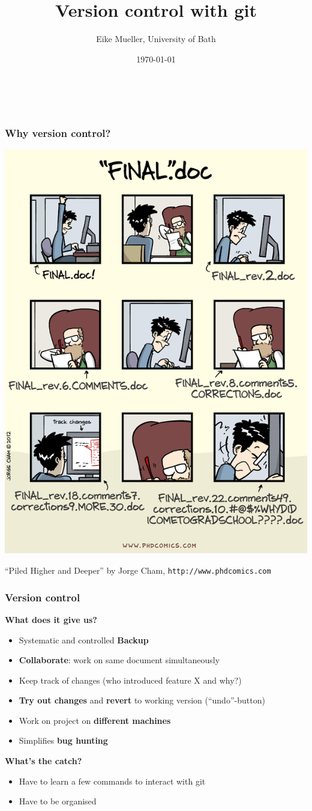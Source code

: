 \documentclass{beamer}
\begin{document}
\title{Version control with git}
\author{Eike Mueller, University of Bath}
\date{\today} 


\begin{frame}
  \frametitle{$ $}
  \titlepage
\end{frame}


\begin{frame}
  \frametitle{Why version control?}
  \begin{center}
    \includegraphics[width=0.5\linewidth]{phdcomics.png}
  \end{center}
  {\footnotesize ``Piled Higher and Deeper'' by Jorge Cham, \texttt{http://www.phdcomics.com}}
\end{frame}


\begin{frame}
  \frametitle{Version control}
  \textbf{\Large What does it give us?}
  \begin{itemize}
  \item Systematic and controlled \textbf{Backup}
  \item \textbf{Collaborate}: work on same document simultaneously
  \item Keep track of changes (who introduced feature X and why?)
  \item \textbf{Try out changes} and \textbf{revert} to working version (``undo''-button)
  \item Work on project on \textbf{different machines}
  \item Simplifies \textbf{bug hunting}
  \end{itemize}
  \vspace{2ex}
  \textbf{\Large What's the catch?}
  \begin{itemize}
    \item Have to learn a few commands to interact with git
    \item Have to be organised
  \end{itemize}
\end{frame}
\end{document}

